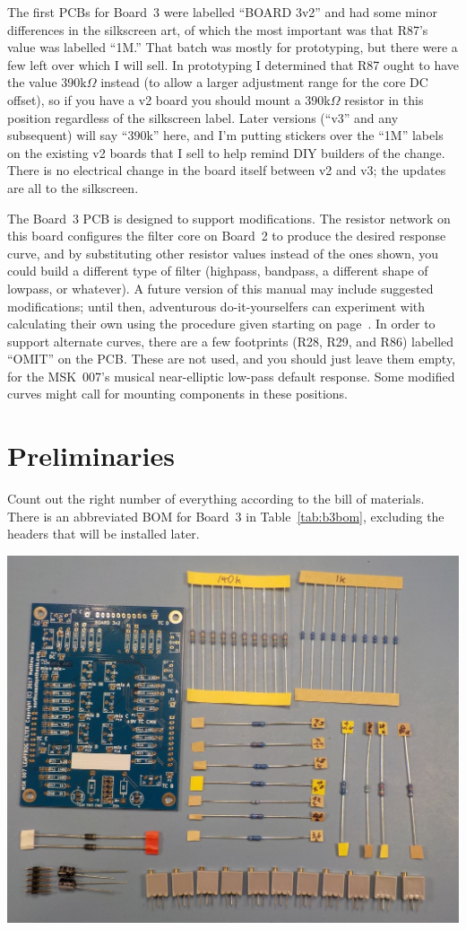 The first PCBs for Board~3 were labelled ``BOARD 3v2'' and had some minor
differences in the silkscreen art, of which the most important was that
R87's value was labelled ``1M.'' That batch was mostly for prototyping, but
there were a few left over which I will sell.  In prototyping I determined
that R87 ought to have the value 390k$\Omega$ instead (to allow a
larger adjustment range for the core DC offset), so if you have a v2 board
you should mount a 390k$\Omega$ resistor in this position regardless of the
silkscreen label.  Later versions (``v3'' and any subsequent) will say
``390k'' here, and I'm putting stickers over the ``1M'' labels on the
existing v2 boards that I sell to help remind DIY builders of the change. 
There is no electrical change in the board itself between v2 and v3; the
updates are all to the silkscreen.

The Board~3 PCB is designed to support modifications.  The resistor network
on this board configures the filter core on Board~2 to produce the desired
response curve, and by substituting other resistor values instead of the
ones shown, you could build a different type of filter (highpass, bandpass,
a different shape of lowpass, or whatever).  A future version of this manual
may include suggested modifications; until then, adventurous
do-it-yourselfers can experiment with calculating their own using the
procedure given starting on page~\pageref{cha:calculations}.  In order to
support alternate curves, there are a few footprints (R28, R29, and R86)
labelled ``OMIT'' on the PCB.  These are not used, and you should just leave
them empty, for the MSK~007's musical near-elliptic low-pass default
response.  Some modified curves might call for mounting components in these
positions.

\section{Preliminaries}

Count out the right number of everything according to the bill of materials. 
There is an abbreviated BOM for Board~3 in Table~\ref{tab:b3bom}, excluding
the headers that will be installed later.

\noindent\includegraphics[width=\linewidth]{board3-parts.jpg}

